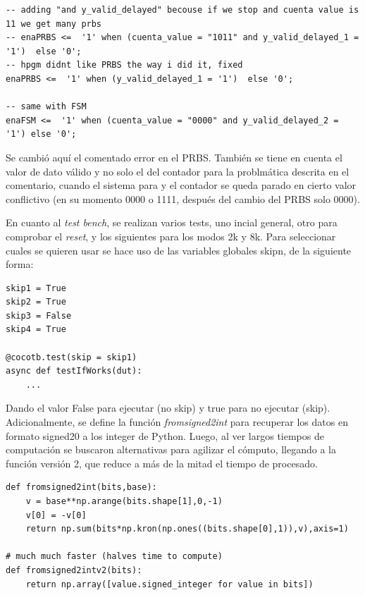 \documentclass[11pt]{scrartcl} %
\begin{document}
\begin{preview}
\begin{verbatim}
-- adding "and y_valid_delayed" becouse if we stop and cuenta value is 11 we get many prbs
-- enaPRBS <=  '1' when (cuenta_value = "1011" and y_valid_delayed_1 = '1')  else '0';
-- hpgm didnt like PRBS the way i did it, fixed
enaPRBS <=  '1' when (y_valid_delayed_1 = '1')  else '0';

-- same with FSM
enaFSM <=  '1' when (cuenta_value = "0000" and y_valid_delayed_2 = '1') else '0';
\end{verbatim}

Se cambió aquí el comentado error en el PRBS. También se tiene en cuenta el valor de dato válido y no solo el del contador para la problmática descrita en el comentario, cuando el sistema para y el contador se queda parado en cierto valor conflictivo (en su momento 0000 o 1111, después del cambio del PRBS solo 0000).

En cuanto al \emph{test bench}, se realizan varios tests, uno incial general, otro para comprobar el \emph{reset}, y los siguientes para los modos 2k y 8k. Para seleccionar cuales se quieren usar se hace uso de las variables globales skipn, de la siguiente forma:

\begin{verbatim}
skip1 = True
skip2 = True
skip3 = False
skip4 = True

@cocotb.test(skip = skip1)
async def testIfWorks(dut):
	...
\end{verbatim}

Dando el valor False para ejecutar (no skip) y true para no ejecutar (skip). Adicionalmente, se define la función \emph{fromsigned2int} para recuperar los datos en formato signed20 a los integer de Python. Luego, al ver largos tiempos de computación se buscaron alternativas para agilizar el cómputo, llegando a la función versión 2, que reduce a más de la mitad el tiempo de procesado.

\begin{verbatim}
def fromsigned2int(bits,base):
    v = base**np.arange(bits.shape[1],0,-1)
    v[0] = -v[0]
    return np.sum(bits*np.kron(np.ones((bits.shape[0],1)),v),axis=1)

# much much faster (halves time to compute)
def fromsigned2intv2(bits):
    return np.array([value.signed_integer for value in bits])
\end{verbatim}


\end{preview}
\end{document}
